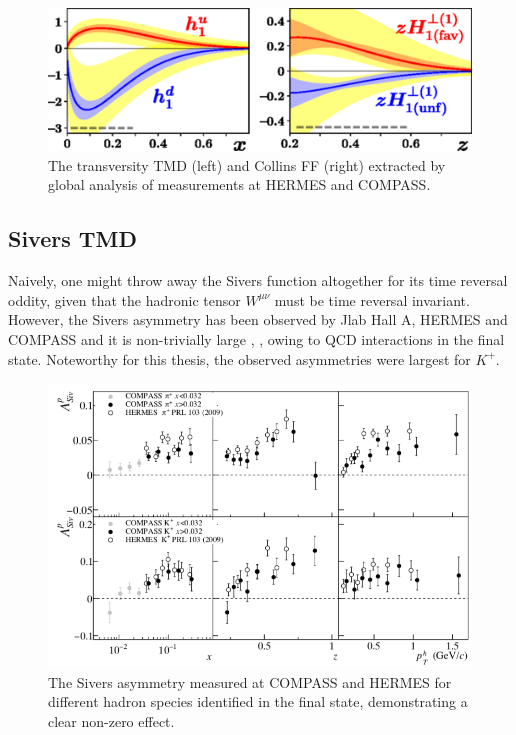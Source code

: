 \begin{figure}
	\centering
	\includegraphics[width=\textwidth]{image/plots/introduction/transversity.png}
	\caption{The transversity TMD (left) and Collins FF (right) extracted by global analysis of measurements at HERMES and COMPASS.}
	\label{fig:trans}
\end{figure}

\subsection{Sivers TMD}
Naively, one might throw away the Sivers function altogether for its time reversal oddity, given that the hadronic tensor $W^{\mu\nu}$ must be time reversal invariant.  However, the Sivers asymmetry has been observed by Jlab Hall A, HERMES and COMPASS and it is non-trivially large \cite{tmds-adolph:2014}, \cite{tmds-qian:2011}, owing to QCD interactions in the final state.  Noteworthy for this thesis, the observed asymmetries were largest for $K^+$.  

\begin{figure}
	\centering
	\includegraphics[width = \textwidth]{image/plots/introduction/sivers.png}
	\caption{The Sivers asymmetry measured at COMPASS and HERMES for different hadron species identified in the final state, demonstrating a clear non-zero effect.}
	\label{fig:sivers}
\end{figure}

